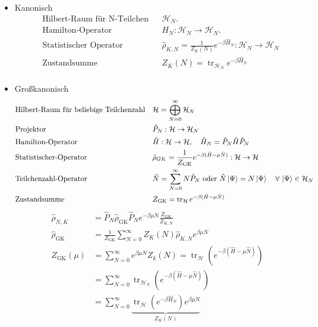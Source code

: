 \documentclass[11pt]{article}
\theoremstyle{plain}
\theoremstyle{mytheoremstyle}
\newcommand{\trace}{\operatorname{tr}}
\begin{document}
\begin{itemize}
  \item Kanonisch 
    \begin{align*}
        & \text{Hilbert-Raum f\"ur N-Teilchen} && \mathcal{H}_N. \\
        & \text{Hamilton-Operator } && H_N:\mathcal{H}_N \to \mathcal{H}_N. \\
        & \text{Statistischer Operator} && \hat{\rho}_{K, N} = \frac{1}{Z_K(N)}  
        e^{-\beta \hat{H}_N} : \mathcal{H}_N \to \mathcal{H}_N \\
               & \text{Zustandsumme } && Z_K(N)= \trace_{\mathcal{H}_N} e ^{-\beta \hat{H}_N} \\
    \end{align*}

  \item Gro\ss{}kanonisch
      \begin{align*}
          & \text{Hilbert-Raum f\"ur beliebige Teilchenzahl}  &&
          \mathcal{H} = \bigoplus_{N=0}^{\infty} \mathcal{H}_N \\
          & \text{Projektor } &&  \hat{P}_N : \mathcal{H} \to \mathcal{H}_N \\
          & \text{Hamilton-Operator } &&  \hat{H}: \mathcal{H} \to \mathcal{H}, \quad
          \hat{H}_N = \hat{P}_N \hat{H} \hat{P}_N \\
          & \text{Statistischer-Operator } &&
          \hat{\rho}_{GK} = \frac{1}{Z_{\text{GK}}} e^{-\beta (\hat{H} - 
          \mu \hat{N})}: \mathcal{H}\to \mathcal{H} \\
          & \text{Teilchenzahl-Operator } &&  \hat{N} = \sum_{N=0}^{\infty} N
          \hat{P}_N \text{ oder } \hat{N} \Ket{\Psi} = N \Ket{\Psi}
          \quad\forall\, \Ket{\Psi} \in \mathcal{H}_N \\
          & \text{Zustandsumme } &&  Z_{\text{GK}} = \trace_{\mathcal{H}} 
          e^{- \beta (\hat{H} - \mu \hat{N})}
      \end{align*}
      \begin{align*}
          \hat{\rho}_{N, K}& = \hat{P}_N \hat{\rho}_{\text{GK}} \hat{P}_N
          e^{- \beta \mu N} \frac{Z_{\text{GK}}}{Z_{K,N}} \\
          \hat{\rho}_{\text{GK}} & = \frac{1}{Z_{\text{GK}}} \sum_{N=0}^{\infty}
          Z_K (N) \hat{\rho}_{K, N} e^{\beta \mu N} \\
          Z_{\text{GK}} (\mu)  & = \sum_{N = 0}^{ \infty} e^{\beta \mu N} Z_k(N) 
          = \trace_{\mathcal{H}} \left( e^{-\beta(\hat{H} - \mu \hat{N})}  \right) \\
          & = \sum_{N=0}^{ \infty} \trace_{\mathcal{H}_N} 
          \left( e^{-\beta(\hat{H} - \mu \hat{N})} \right)  \\
          & = \sum_{N=0}^{\infty} 
          \underbrace{\trace_{\mathcal{H}} \left( e^{-\beta \hat{H}_N} \right) e^{\beta \mu N}}_{Z_K(N)}
      \end{align*}
\end{itemize}
\end{document}
